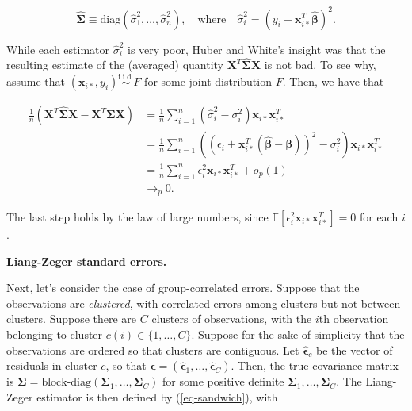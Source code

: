 \documentclass[
  11pt,
  letterpaper,
  oneside]{book}
\theoremstyle{definition}
\theoremstyle{plain}
\theoremstyle{plain}
\theoremstyle{plain}
\theoremstyle{remark}
\begin{document}
\[
\boldsymbol{\widehat{\Sigma}} \equiv \text{diag}(\widehat{\sigma}_1^2, \dots, \widehat{\sigma}_n^2), \quad \text{where} \quad \widehat{\sigma}_i^2 = (y_i - \boldsymbol{x}_{i*}^T \boldsymbol{\widehat{\beta}})^2.
\]

While each estimator \(\widehat{\sigma}_i^2\) is very poor, Huber and
White's insight was that the resulting estimate of the (averaged)
quantity
\(\boldsymbol{X}^T \boldsymbol{\widehat{\Sigma}}\boldsymbol{X}\) is not
bad. To see why, assume that
\((\boldsymbol{x}_{i*}, y_i) \overset{\text{i.i.d.}}{\sim} F\) for some
joint distribution \(F\). Then, we have that

\[
\begin{split}
\frac{1}{n}(\boldsymbol{X}^T \widehat{\boldsymbol{\Sigma}} \boldsymbol{X} - \boldsymbol{X}^T \boldsymbol{\Sigma} \boldsymbol{X}) &= \frac{1}{n} \sum_{i=1}^n (\widehat{\sigma}_i^2 - \sigma_i^2) \boldsymbol{x}_{i*} \boldsymbol{x}_{i*}^T \\
&= \frac{1}{n} \sum_{i=1}^n ((\epsilon_i + \boldsymbol{x}_{i*}^T(\widehat{\boldsymbol{\beta}} - \boldsymbol{\beta}))^2 - \sigma_i^2) \boldsymbol{x}_{i*} \boldsymbol{x}_{i*}^T \\
&= \frac{1}{n} \sum_{i=1}^n \epsilon_i^2 \boldsymbol{x}_{i*} \boldsymbol{x}_{i*}^T + o_p(1) \\
&\to_p 0.
\end{split}
\]

The last step holds by the law of large numbers, since
\(\mathbb{E}[\epsilon_i^2 \boldsymbol{x}_{i*} \boldsymbol{x}_{i*}^T] = 0\)
for each \(i\).

\textbf{Liang-Zeger standard errors.}

Next, let's consider the case of group-correlated errors. Suppose that
the observations are \emph{clustered}, with correlated errors among
clusters but not between clusters. Suppose there are \(C\) clusters of
observations, with the \(i\)th observation belonging to cluster
\(c(i) \in \{1, \dots, C\}\). Suppose for the sake of simplicity that
the observations are ordered so that clusters are contiguous. Let
\(\boldsymbol{\widehat{\epsilon}}_c\) be the vector of residuals in
cluster \(c\), so that
\(\boldsymbol{\widehat{\epsilon}} = (\boldsymbol{\widehat{\epsilon}}_1, \dots, \boldsymbol{\widehat{\epsilon}}_C)\).
Then, the true covariance matrix is
\(\boldsymbol{\Sigma} = \text{block-diag}(\boldsymbol{\Sigma}_1, \dots, \boldsymbol{\Sigma}_C)\)
for some positive definite
\(\boldsymbol{\Sigma}_1, \dots, \boldsymbol{\Sigma}_C\). The Liang-Zeger
estimator is then defined by (\ref{eq-sandwich}), with
\end{document}
